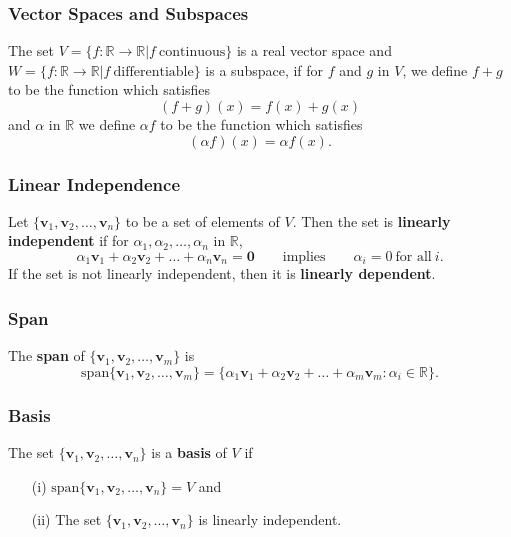 \documentclass{beamer}
\begin{document}
\begin{frame}
\frametitle{Vector Spaces and Subspaces}
\begin{Example}
The set $V = \{f:\mathbb{R}\to\mathbb{R}| f\ \text{continuous}\}$ is a real vector space and $W = \{f:\mathbb{R}\to\mathbb{R}| f\ \text{differentiable}\}$ is a subspace, if for $f$ and $g$ in $V$, we define $f + g$ to be the function which satisfies 
$$
(f + g)(x) = f(x) + g(x)
$$
and $\alpha$ in $\mathbb{R}$ we define $\alpha f$ to be the function which satisfies 
$$
(\alpha f)(x) = \alpha f(x).
$$
\end{Example}
\end{frame}

\begin{frame}
\frametitle{Linear Independence}
\begin{Definition}
Let $\{{\boldsymbol v_1}, {\boldsymbol v_2},\ldots, {\boldsymbol v_n}\}$ to be a set of elements of $V$. Then the set is {\bf linearly independent} if for $\alpha_1, \alpha_2,\ldots, \alpha_n$ in $\mathbb{R}$, 
$$
\alpha_1 {\boldsymbol v_1} + \alpha_2 {\boldsymbol v_2}+\ldots + \alpha_n {\boldsymbol v_n} = {\boldsymbol 0} \qquad\text{implies}\qquad \alpha_i = 0\ \text{for all}\ i.
$$
If the set is not linearly independent, then it is {\bf linearly dependent}. 
\end{Definition}

\end{frame}

\begin{frame}
\frametitle{Span}
\begin{Definition}
The {\bf span} of $\{{\boldsymbol v_1}, {\boldsymbol v_2},\ldots, {\boldsymbol v_m}\}$ is 
$$
\text{span}\{{\boldsymbol v_1}, {\boldsymbol v_2},\ldots, {\boldsymbol v_m}\} = \{\alpha_1{\boldsymbol v_1} + \alpha_2{\boldsymbol v_2} + \ldots + \alpha_m {\boldsymbol v_m} : \alpha_i\in\mathbb{R}\}.
$$
\end{Definition}
\end{frame}

\begin{frame}
\frametitle{Basis}
\begin{Definition}
The set $\{{\boldsymbol v_1}, {\boldsymbol v_2},\ldots, {\boldsymbol v_n}\}$ is a {\bf basis} of $V$ if
\begin{enumerate}
\item[(i)] $\text{span}\{{\boldsymbol v_1}, {\boldsymbol v_2},\ldots, {\boldsymbol v_n}\} = V$ and
\item[(ii)] The set $\{{\boldsymbol v_1}, {\boldsymbol v_2},\ldots, {\boldsymbol v_n}\}$ is linearly independent.
\end{enumerate}
\end{Definition}
\end{frame}
\end{document}
